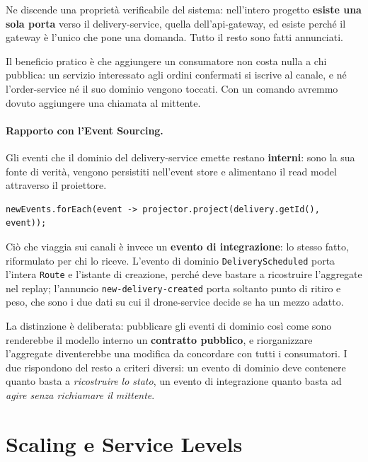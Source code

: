 \documentclass[12pt,a4paper]{article}
\begin{document}
Ne discende una propriet\`a verificabile del sistema: nell'intero progetto \textbf{esiste una sola porta}
verso il delivery-service, quella dell'api-gateway, ed esiste perch\'e il gateway \`e l'unico che
pone una domanda. Tutto il resto sono fatti annunciati.

Il beneficio pratico \`e che aggiungere un consumatore non costa nulla a chi pubblica: un servizio
interessato agli ordini confermati si iscrive al canale, e n\'e l'order-service n\'e il suo dominio
vengono toccati. Con un comando avremmo dovuto aggiungere una chiamata al mittente.

\paragraph{Rapporto con l'Event Sourcing.} Gli eventi che il dominio del delivery-service emette
restano \textbf{interni}: sono la sua fonte di verit\`a, vengono persistiti nell'event store e
alimentano il read model attraverso il proiettore.

\begin{lstlisting}[caption={Il read model e' derivato dallo stream, e ricostruibile da esso}]
newEvents.forEach(event -> projector.project(delivery.getId(), event));
\end{lstlisting}

Ci\`o che viaggia sui canali \`e invece un \textbf{evento di integrazione}: lo stesso fatto,
riformulato per chi lo riceve. L'evento di dominio \texttt{DeliveryScheduled} porta l'intera
\texttt{Route} e l'istante di creazione, perch\'e deve bastare a ricostruire l'aggregate nel replay;
l'annuncio \texttt{new-delivery-created} porta soltanto punto di ritiro e peso, che sono i due dati
su cui il drone-service decide se ha un mezzo adatto.

La distinzione \`e deliberata: pubblicare gli eventi di dominio cos\`i come sono renderebbe il
modello interno un \textbf{contratto pubblico}, e riorganizzare l'aggregate diventerebbe una
modifica da concordare con tutti i consumatori. I due rispondono del resto a criteri diversi: un
evento di dominio deve contenere quanto basta a \emph{ricostruire lo stato}, un evento di
integrazione quanto basta ad \emph{agire senza richiamare il mittente}.

\section{Scaling e Service Levels}
\end{document}
